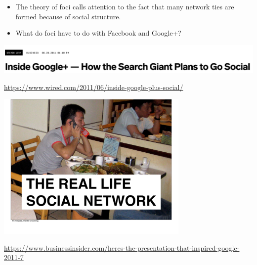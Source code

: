\documentclass{beamer}
\begin{document}
\begin{frame}

\begin{itemize}
\item The theory of foci calls attention to the fact that many network ties are formed because of social structure.
\pause
\item What do foci have to do with Facebook and Google+?
\end{itemize}

\end{frame}
\begin{frame}

\begin{center}
 \includegraphics[height=0.7\textheight]{figures/levy_inside_2011_title}
\end{center}

\vfill

\url{https://www.wired.com/2011/06/inside-google-plus-social/}

\end{frame}
\begin{frame}


\begin{center}
 \includegraphics[width=0.7\textwidth]{figures/adams_real_2011_page1}
\end{center}

\vfill
\url{https://www.businessinsider.com/heres-the-presentation-that-inspired-google-2011-7}

\end{frame}
\end{document}
